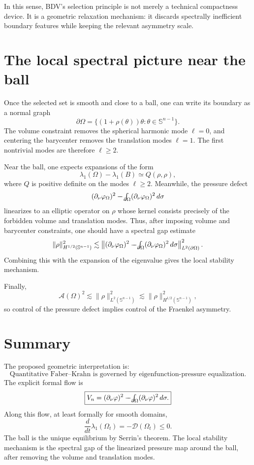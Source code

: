\documentclass[11pt]{article}
\newcommand{\Om}{\Omega}
\newcommand{\Sph}{\mathbb{S}}
\newcommand{\A}{\mathcal A}
\newcommand{\D}{\mathcal D}
\newcommand{\fint}{\mathop{\mathchoice{\vcenter{\hbox{\Large$\int$}}\kern-1.4em\vcenter{\hbox{\scriptsize$-$}}}{\vcenter{\hbox{\large$\int$}}\kern-1.1em\vcenter{\hbox{\scriptsize$-$}}}{\vcenter{\hbox{$\int$}}\kern-.85em\vcenter{\hbox{\scriptsize$-$}}}{\vcenter{\hbox{$\int$}}\kern-.7em\vcenter{\hbox{\tiny$-$}}}}\nolimits}
\begin{document}
In this sense, BDV's selection principle is not merely a technical compactness device. It is a geometric relaxation mechanism: it discards spectrally inefficient boundary features while keeping the relevant asymmetry scale.

\section{The local spectral picture near the ball}

Once the selected set is smooth and close to a ball, one can write its boundary as a normal graph
\[
    \partial \Om = \{(1+\rho(\theta))\theta : \theta \in \Sph^{n-1}\}.
\]
The volume constraint removes the spherical harmonic mode $\ell=0$, and centering the barycenter removes the translation modes $\ell=1$. The first nontrivial modes are therefore $\ell\geq 2$.

Near the ball, one expects expansions of the form
\[
    \lambda_1(\Om)-\lambda_1(B)
    \simeq Q(\rho,\rho),
\]
where $Q$ is positive definite on the modes $\ell\geq 2$. Meanwhile, the pressure defect
\[
    (\partial_\nu\varphi_\Om)^2
    - \fint_{\partial\Om}(\partial_\nu\varphi_\Om)^2\,d\sigma
\]
linearizes to an elliptic operator on $\rho$ whose kernel consists precisely of the forbidden volume and translation modes. Thus, after imposing volume and barycenter constraints, one should have a spectral gap estimate
\[
    \|\rho\|_{H^{1/2}(\Sph^{n-1})}^2
    \lesssim
    \left\|
    (\partial_\nu\varphi_\Om)^2
    - \fint_{\partial\Om}(\partial_\nu\varphi_\Om)^2\,d\sigma
    \right\|_{L^2(\partial\Om)}^2.
\]
Combining this with the expansion of the eigenvalue gives the local stability mechanism.

Finally,
\[
    \A(\Om)^2
    \lesssim \|\rho\|_{L^2(\Sph^{n-1})}^2
    \lesssim \|\rho\|_{H^{1/2}(\Sph^{n-1})}^2,
\]
so control of the pressure defect implies control of the Fraenkel asymmetry.

\section{Summary}

The proposed geometric interpretation is:
\[
\boxed{
\text{Quantitative Faber--Krahn is governed by eigenfunction-pressure equalization.}
}
\]
The explicit formal flow is
\[
\boxed{
    V_n
    = (\partial_\nu\varphi)^2
    - \fint_{\partial\Om}(\partial_\nu\varphi)^2\,d\sigma .
}
\]
Along this flow, at least formally for smooth domains,
\[
\boxed{
    \frac{d}{dt}\lambda_1(\Om_t)
    = -\D(\Om_t) \leq 0.
}
\]
The ball is the unique equilibrium by Serrin's theorem. The local stability mechanism is the spectral gap of the linearized pressure map around the ball, after removing the volume and translation modes.
\end{document}
